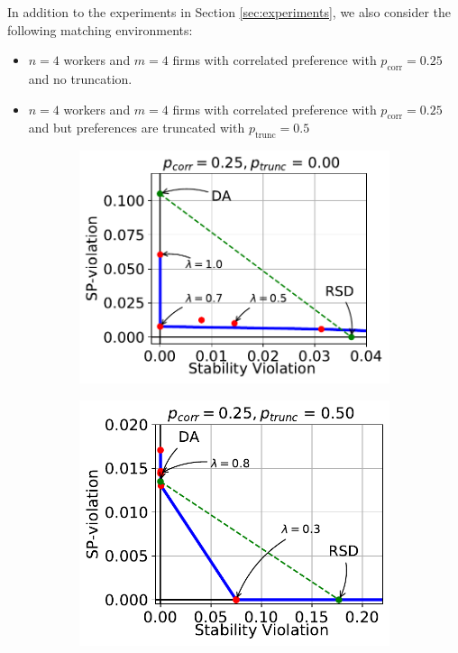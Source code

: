 In addition to the experiments in Section \ref{sec:experiments}, we also consider the following matching environments:
\begin{itemize}[leftmargin=*]
\item $n = 4$ workers and $m = 4$ firms with correlated preference with $p_{\mathrm{corr}} = 0.25$ and no truncation.
\item $n = 4$ workers and $m = 4$ firms with correlated preference with $p_{\mathrm{corr}} = 0.25$ and but preferences are truncated with $p_{\mathrm{trunc}} = 0.5$
\end{itemize}
\begin{figure}[h!]
\centering
\begin{subfigure}[b]{0.49\textwidth}
\centering
\includegraphics[scale=0.5]{plots/p_0.00_corr_0.25.pdf}
\end{subfigure}
\begin{subfigure}[b]{0.49\textwidth}
\centering
\includegraphics[scale=0.5]{plots/p_0.50_corr_0.25.pdf}

\end{subfigure}
\end{figure}
